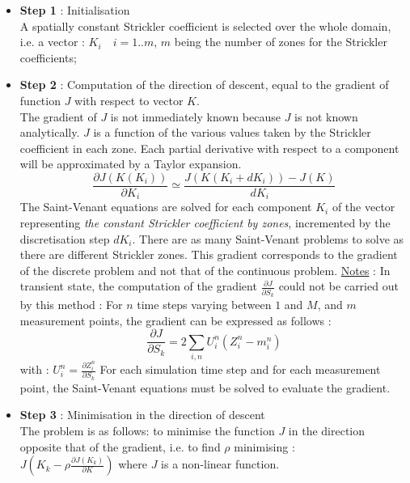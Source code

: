 \begin{itemize}
  \item \textbf{Step 1} : Initialisation \\
   A spatially constant Strickler coefficient is selected over the whole domain, i.e. a vector : $K_i \quad i=1..m$, $m$ being the number of zones for the Strickler coefficients;
  \item \textbf{Step 2} : Computation of the direction of descent, equal to the gradient of function $J$ with respect to vector $K$. \\
    The gradient of $J$ is not immediately known because $J$ is not known analytically.
    $J$ is a function of the various values taken by the Strickler coefficient in each zone. Each partial derivative with respect to a component will be approximated by a Taylor expansion.
    \begin{equation}
      \frac{\partial J(K(K_i))}{\partial K_i} \simeq \frac{J(K(K_i+dK_i))-J(K)}{dK_i}
    \end{equation}
    The Saint-Venant equations are solved for each component $K_i$ of the vector representing \textit{the constant Strickler coefficient by zones}, incremented by the discretisation step $dK_i$. There are as many Saint-Venant problems to solve as there are different Strickler zones.
    This gradient corresponds to the gradient of the discrete problem and not that of the continuous problem.
    \underline{Notes} : In transient state, the computation of the gradient $\frac{\partial J}{\partial S_k}$ could not be carried out by this method :
    \vspace{0.5cm}
    For $n$ time steps varying between $1$ and $M$, and $m$ measurement points, the gradient can be expressed as follows :
    \begin{equation}
      \frac{\partial J}{\partial S_k} = 2 \sum_{i,n} U_{i}^n (Z_{i}^n - m_{i}^n)
    \end{equation}
    with : $U_{i}^n = \frac{\partial Z_{i}^n}{\partial S_k}$
    \vspace{0.5cm}
    For each simulation time step and for each measurement point, the Saint-Venant equations must be solved to evaluate the gradient.
  \item \textbf{Step 3} : Minimisation in the direction of descent \\
    The problem is as follows: to minimise the function $J$ in the direction opposite that of the gradient, i.e. to find $\rho$ minimising : \\
    $J \left ( K_k - \rho \frac{\partial J(K_k)}{\partial K} \right )$ where $J$ is a non-linear function.

\end{itemize}
